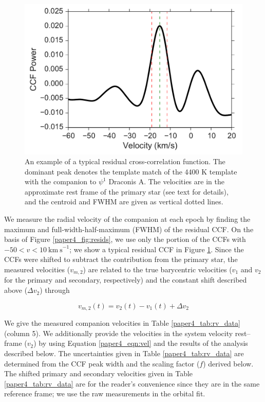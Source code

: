 \begin{figure}[t]
  \centering
  \includegraphics[width=\columnwidth]{Figures/paper4_Typical_CCF.pdf}
  \caption{An example of a typical residual cross-correlation function. The dominant peak denotes the template match of the 4400 K template with the companion to $\psi^1$ Draconis A. The velocities are in the approximate rest frame of the primary star (see text for details), and the centroid and FWHM are given as vertical dotted lines.}
  \label{paper4_fig:ccf_typical}
\end{figure}




We measure the radial velocity of the companion at each epoch by finding the maximum and full-width-half-maximum (FWHM) of the residual CCF. On the basis of Figure \ref{paper4_fig:resids}, we use only the portion of the CCFs with $-50 < v < 10\ \mathrm{km\ s}^{-1}$; we show a typical residual CCF in Figure \ref{paper4_fig:ccf_typical}. Since the CCFs were shifted to subtract the contribution from the primary star, the measured velocities ($v_{m, 2}$) are related to the true barycentric velocities ($v_1$ and $v_2$ for the primary and secondary, respectively) and the constant shift described above ($\Delta v_2$) through

\begin{equation}
v_{m, 2}(t) = v_2(t) - v_1(t) + \Delta v_2
\label{paper4_eqn:vel}
\end{equation}

We give the measured companion velocities in Table \ref{paper4_tab:rv_data} (column 5). We additionally provide the velocities in the system velocity rest--frame ($v_2$) by using Equation \ref{paper4_eqn:vel} and the results of the analysis described below. The uncertainties given in Table \ref{paper4_tab:rv_data} are determined from the CCF peak width and the scaling factor ($f$) derived below. The shifted primary and secondary velocities given in Table \ref{paper4_tab:rv_data} are for the reader's convenience since they are in the same reference frame; we use the raw measurements in the orbital fit.


